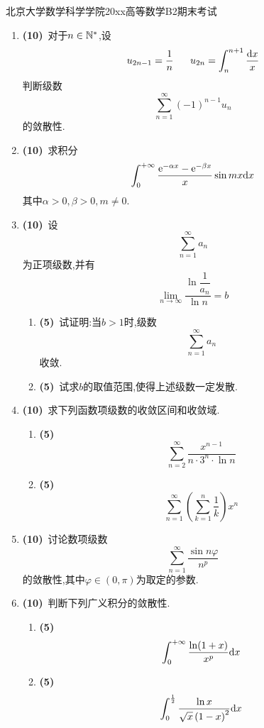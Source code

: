 \documentclass{ctexart}
\begin{document}
\pagestyle{empty}
\begin{center}\Large
    北京大学数学科学学院20xx高等数学B2期末考试
\end{center}
\begin{enumerate}[leftmargin=*,label=\textbf{\arabic*.},topsep=0pt,parsep=0pt,itemsep=0pt,partopsep=0pt]
    \item \textbf{(10)}\ 对于$n\in\mathbb{N}^*$,设
        \[u_{2n-1}=\dfrac1n\ \ \ \ \ u_{2n}=\int_n^{n+1}\dfrac{\di x}{x}\]
        判断级数
        \[\sum_{n=1}^{\infty}(-1)^{n-1}u_n\]
        的敛散性.

    \item \textbf{(10)}\ 求积分
        \[\int_0^{+\infty}\dfrac{\mathrm{e}^{-\alpha x}-\mathrm{e}^{-\beta x}}{x}\sin mx\mathrm{d} x\]
        其中$\alpha>0,\beta>0,m\neq0$.

    \item \textbf{(10)}\ 设
        \[\sum_{n=1}^{\infty}a_n\]
        为正项级数,并有
        \[\lim_{n\to\infty}\dfrac{\ln\dfrac{1}{a_n}}{\ln n}=b\]
        \begin{enumerate}[label=\tbf{(\arabic*)},topsep=0pt,parsep=0pt,itemsep=0pt,partopsep=0pt]
            \item \textbf{(5)}\ 试证明:当$b>1$时,级数
                \[\sum_{n=1}^{\infty}a_n\]
                收敛.
            \item \textbf{(5)}\ 试求$b$的取值范围,使得上述级数一定发散.
        \end{enumerate}

    \item \textbf{(10)}\ 求下列函数项级数的收敛区间和收敛域.
        \begin{enumerate}[label=\tbf{(\arabic*)},topsep=0pt,parsep=0pt,itemsep=0pt,partopsep=0pt]
            \item \textbf{(5)}\ 
                \[\sum_{n=2}^{\infty}\dfrac{x^{n-1}}{n\cdot3^n\cdot\ln n}\]
            \item \textbf{(5\songti{分})}\ 
                \[\sum_{n=1}^{\infty}\left(\sum_{k=1}^{n}\dfrac{1}{k}\right)x^n\]

        \end{enumerate}

    \item \textbf{(10)}\ 讨论数项级数
        \[\sum_{n=1}^{\infty}\dfrac{\sin n\varphi}{n^p}\]
        的敛散性,其中$\varphi\in(0,\pi)$为取定的参数.

    \item \textbf{(10)}\ 判断下列广义积分的敛散性.
        \begin{enumerate}[label=\tbf{(\arabic*)},topsep=0pt,parsep=0pt,itemsep=0pt,partopsep=0pt]
            \item \textbf{(5)}
                \[\int_0^{+\infty}\dfrac{\ln(1+x)}{x^p}\mathrm{d} x\]
            \item \textbf{(5\songti{分})}
                \[\int_0^{\frac12}\dfrac{\ln x}{\sqrt{x}\left(1-x\right)^2}\mathrm{d} x\]


\end{enumerate}
\end{enumerate}
\end{document}
